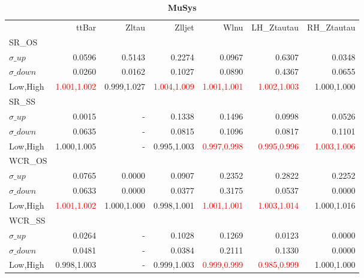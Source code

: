 \documentclass[11pt,oneside,a4paper]{article}
\begin{document}
\begin{table}
\caption{\bf{MuSys}}
\centering
\begin{tabular}{lrrrrrr}
& ttBar & Zltau & Zlljet & Wlnu & LH\_Ztautau & RH\_Ztautau \\

SR\_OS &  &  &  &  &  &  \\
$\sigma\_up$ & 0.0596 & 0.5143 & 0.2274 & 0.0967 & 0.6307 & 0.0348 \\
$\sigma\_down$ & 0.0260 & 0.0162 & 0.1027 & 0.0890 & 0.4367 & 0.0655 \\
Low,High & \textcolor{red}{1.001,1.002} & 0.999,1.027 & \textcolor{red}{1.004,1.009} & \textcolor{red}{1.001,1.001} & \textcolor{red}{1.002,1.003} & 1.000,1.000 \\

\hline
SR\_SS &  &  &  &  &  &  \\
$\sigma\_up$ & 0.0015 & - & 0.1338 & 0.1496 & 0.0998 & 0.0526 \\
$\sigma\_down$ & 0.0635 & - & 0.0815 & 0.1096 & 0.0817 & 0.1101 \\
Low,High & 1.000,1.005 & - & 0.995,1.003 & \textcolor{red}{0.997,0.998} & \textcolor{red}{0.995,0.996} & \textcolor{red}{1.003,1.006} \\

\hline
WCR\_OS &  &  &  &  &  &  \\
$\sigma\_up$ & 0.0765 & 0.0000 & 0.0907 & 0.2352 & 0.2822 & 0.2252 \\
$\sigma\_down$ & 0.0633 & 0.0000 & 0.0377 & 0.3175 & 0.0537 & 0.0000 \\
Low,High & \textcolor{red}{1.001,1.002} & 1.000,1.000 & 0.998,1.001 & \textcolor{red}{1.001,1.001} & \textcolor{red}{1.003,1.014} & 1.000,1.016 \\

\hline
WCR\_SS &  &  &  &  &  &  \\
$\sigma\_up$ & 0.0264 & - & 0.1028 & 0.1269 & 0.0123 & 0.0000 \\
$\sigma\_down$ & 0.0481 & - & 0.0384 & 0.2111 & 0.1330 & 0.0000 \\
Low,High & 0.998,1.003 & - & 0.999,1.003 & \textcolor{red}{0.999,0.999} & \textcolor{red}{0.985,0.999} & 1.000,1.000 \\

\end{tabular}
\end{table}
\end{document}
